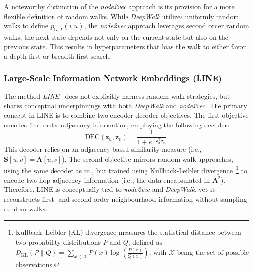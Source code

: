 A noteworthy distinction of the \textit{node2vec} approach is its provision for a more flexible definition of random walks. While \textit{DeepWalk} utilizes uniformly random walks to define $ p_{G,T}(v|u) $, the \textit{node2vec} approach leverages second order random walks, the next state depends not only on the current state but also on the previous state. This results in hyperparameters that bias the walk to either favor a depth-first or breadth-first search.

\subsubsection{Large-Scale Information Network Embeddings (LINE)}
The method \textit{LINE}~\cite{Tang2015line} does not explicitly harness random walk strategies, but shares conceptual underpinnings with both \textit{DeepWalk} and \textit{node2vec}. The primary concept in LINE is to combine two encoder-decoder objectives. The first objective encodes first-order adjacency information, employing the following decoder:
\begin{equation*}
    \text{DEC}(\mathbf{z}_u, \mathbf{z}_v) = \frac{1}{1 + e^{-\mathbf{z}_u^\top\mathbf{z}_v}}.
\end{equation*}
This decoder relies on an adjacency-based similarity measure (i.e., $ \textbf{S}[u,v] = \mathbf{A}[u,v] $). The second objective mirrors random walk approaches, using the same decoder as in , but trained using Kullback-Leibler divergence~\footnote{Kullback–Leibler (KL) divergence measures the statistical distance between two probability distributions $P$ and $Q$, defined as $ D_{\text{KL}}(P\parallel Q)=\sum_{x\in \mathcal{X}}P(x)\log \left(\frac{P(x)}{Q(x)}\right) $, with $\mathcal{X}$ being the set of possible observations.} to encode two-hop adjacency information (i.e., the data encapsulated in $ \mathbf{A}^2 $). Therefore, LINE is conceptually tied to \textit{node2vec} and \textit{DeepWalk}, yet it reconstructs first- and second-order neighbourhood information without sampling random walks.

